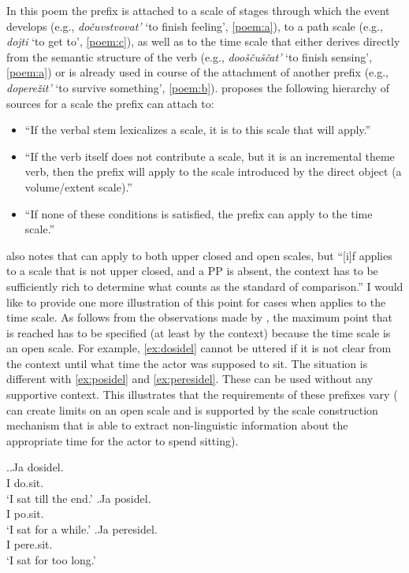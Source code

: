 In this poem the prefix  is attached to a scale of stages through which the event develops (e.g., \textit{do\v{c}uvstvovat'} `to finish feeling', \ref{poem:a}), to a path scale (e.g., \textit{dojti} `to get to', \ref{poem:c}), as well as to the time scale that either derives directly from the semantic structure of the verb (e.g., \textit{doo\v{s}\v{c}u\v{s}\v{c}at'} `to finish sensing', \ref{poem:a}) or is already used in course of the attachment of another prefix (e.g., \textit{dopere\v{z}it'} `to survive something', \ref{poem:b}). \citet{Kagan:book} proposes the following hierarchy of sources for a scale the prefix  can attach to: 

\begin{itemize}
\item ``If the verbal stem lexicalizes a scale, it is to this scale that  will apply.''
\item ``If the verb itself does not contribute a scale, but it is an incremental
theme verb, then the prefix will apply to the scale introduced by the direct object (a volume/extent scale).''
\item ``If none of these conditions is satisfied, the prefix can apply to the time scale.''
\end{itemize}

\citet{Kagan:12} also notes that  can apply to both upper closed and open scales, but ``[i]f  applies to a scale that is not upper closed, and a PP is absent, the context has to be sufficiently rich to determine what counts as the standard of comparison.'' I would like to provide one more illustration of this point for cases when  applies to the time scale. As follows from the observations made by \citet{Kagan:12}, the maximum point that is reached has to be specified (at least by the context) because the time scale is an open scale. For example, \ref{ex:dosidel} cannot be uttered if it is not clear from the context until what time the actor was supposed to sit. The situation is different with \ref{ex:posidel} and \ref{ex:peresidel}. These can be used without any supportive context. This illustrates that the requirements of these prefixes vary ( can create limits on an open scale and  is supported by the scale construction mechanism that is able to extract non-linguistic information about the appropriate time for the actor to spend sitting).

\ex.\ag.\label{ex:dosidel}Ja dosidel.\\
I do.sit.\\
\trans `I sat till the end.'
\bg.\label{ex:posidel}Ja posidel.\\
I po.sit.\\
\trans `I sat for a while.'
\bg.\label{ex:peresidel}Ja peresidel.\\
I pere.sit.\\
\trans `I sat for too long.'

